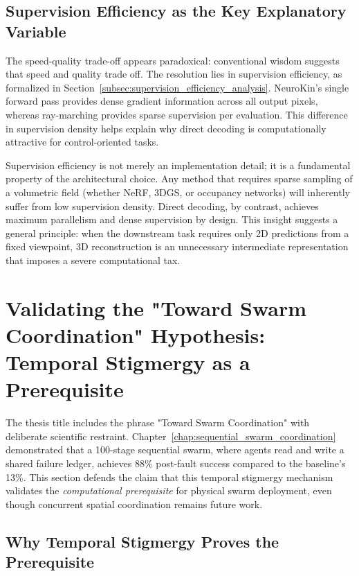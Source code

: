 \documentclass[12pt,a4paper,oneside]{report}
\begin{document}
\subsection{Supervision Efficiency as the Key Explanatory Variable}
\label{subsec:supervision_efficiency_as_the_key_explanatory_variable}

The speed-quality trade-off appears paradoxical: conventional wisdom suggests that speed and quality trade off. The resolution lies in supervision efficiency, as formalized in Section~\ref{subsec:supervision_efficiency_analysis}. NeuroKin's single forward pass provides dense gradient information across all output pixels, whereas ray-marching provides sparse supervision per evaluation. This difference in supervision density helps explain why direct decoding is computationally attractive for control-oriented tasks.

Supervision efficiency is not merely an implementation detail; it is a fundamental property of the architectural choice. Any method that requires sparse sampling of a volumetric field (whether NeRF, 3DGS, or occupancy networks) will inherently suffer from low supervision density. Direct decoding, by contrast, achieves maximum parallelism and dense supervision by design. This insight suggests a general principle: when the downstream task requires only 2D predictions from a fixed viewpoint, 3D reconstruction is an unnecessary intermediate representation that imposes a severe computational tax.

\section{Validating the "Toward Swarm Coordination" Hypothesis: Temporal Stigmergy as a Prerequisite}

The thesis title includes the phrase "Toward Swarm Coordination" with deliberate scientific restraint. Chapter~\ref{chap:sequential_swarm_coordination} demonstrated that a 100-stage sequential swarm, where agents read and write a shared failure ledger, achieves 88\% post-fault success compared to the baseline's 13\%. This section defends the claim that this temporal stigmergy mechanism validates the \textit{computational prerequisite} for physical swarm deployment, even though concurrent spatial coordination remains future work.

\subsection{Why Temporal Stigmergy Proves the Prerequisite}
\label{subsec:why_temporal_stigmergy_proves_the_prerequisite_1}
\end{document}

